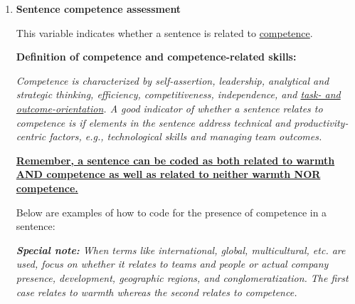 \documentclass[jou]{apa7}
\begin{document}
\begin{enumerate}[label=\textbf{C\arabic*.}, wide=0pt, itemindent=0.25\textwidth]
\begin{enumerate}[label=\textbf{C\arabic{enumi}.\arabic*.}, wide=0pt]
        \noindent\textbf{\small Example: Warmth}

        \noindent\textit{\small “The candidate will develop and manage customers as well as ensure a planned approach to Customer Relationship Management in terms of identifying and strengthening revenue, relationship building and ensuring customer retention and customer visits”.}

        \begin{adjustwidth}{0.75cm}{}
            {\small Although the above example sentence mentions a specific managerial approach, its focus is on skills that are related to customer interactions, e.g., relationship building. This sentence can thus be coded as relating to warmth traits. The coding should reflect that warmth relating traits are present. Note that sentences can also be coded to reflect the presence of competence related traits if applicable.}
            \end{adjustwidth}

        \noindent\textbf{\large \uline{The sentence is:}}


        \\

        \item \noindent\textbf{Sentence competence assessment}

        This variable indicates whether a sentence is related to \uline{competence}.

        \noindent\textbf{Definition of competence and competence-related skills:}

        \textit{Competence is characterized by self-assertion, leadership, analytical and strategic thinking, efficiency, competitiveness, independence, and \uline{task- and outcome-orientation}. A good indicator of whether a sentence relates to competence is if elements in the sentence address technical and productivity-centric factors, e.g., technological skills and managing team outcomes.}

        \noindent\textbf{\uline{Remember, a sentence can be coded as both related to warmth AND competence as well as related to neither warmth NOR competence.}}

        \noindent Below are examples of how to code for the presence of competence in a sentence:

        \noindent\textit{\textbf{Special note:} When terms like international, global, multicultural, etc. are used, focus on whether it relates to teams and people or actual company presence, development, geographic regions, and conglomeratization. The first case relates to warmth whereas the second relates to competence.}


\end{enumerate}
\end{enumerate}
\end{document}
